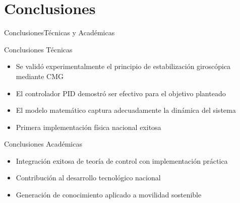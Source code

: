 \documentclass[10pt,xcolor={dvipsnames}]{beamer}
\begin{document}
\section{Conclusiones}
\begin{frame}{Conclusiones}{Técnicas y Académicas}

\begin{block}{Conclusiones Técnicas}
\begin{itemize}
    \item Se validó experimentalmente el principio de estabilización giroscópica mediante CMG
    \item El controlador PID demostró ser efectivo para el objetivo planteado
    \item El modelo matemático captura adecuadamente la dinámica del sistema
    \item Primera implementación física nacional exitosa
\end{itemize}
\end{block}

\begin{block}{Conclusiones Académicas}
\begin{itemize}
    \item Integración exitosa de teoría de control con implementación práctica
    \item Contribución al desarrollo tecnológico nacional
    \item Generación de conocimiento aplicado a movilidad sostenible
\end{itemize}
\end{block}
\end{frame}
\end{document}
